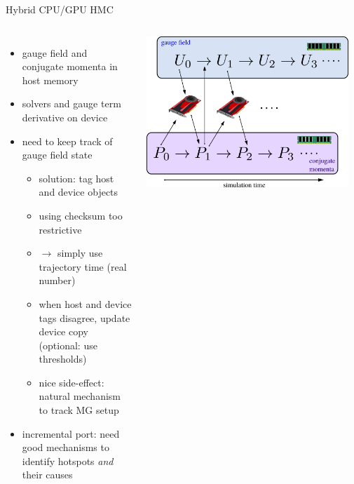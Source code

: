 \documentclass[xcolor={dvipsnames,table}]{beamer}
\begin{document}
\begin{frame}{Hybrid CPU/GPU HMC}
  \begin{columns}
      \begin{itemize}
        \item gauge field and conjugate momenta in host memory
        \vspace{0.20cm}
        \item solvers and gauge term derivative on device 
        \vspace{0.20cm}
        \item need to keep track of gauge field state
        \begin{itemize}
          \item solution: tag host and device objects 
          \vspace{0.1cm}
          \item using checksum too restrictive
          \vspace{0.1cm}
          \item $\rightarrow$ simply use trajectory time (real number)
          \vspace{0.10cm}
          \item when host and device tags disagree, update device copy (optional: use thresholds)
          \vspace{0.10cm}
          \item nice side-effect: natural mechanism to track MG setup
        \end{itemize}
        \vspace{0.3cm}
        \item incremental port: need good mechanisms to identify hotspots \textit{and} their causes
      \end{itemize}
      \includegraphics[width=0.95\textwidth]{HMC_cpu_gpu}
  \end{columns}
\end{frame}
\end{document}
